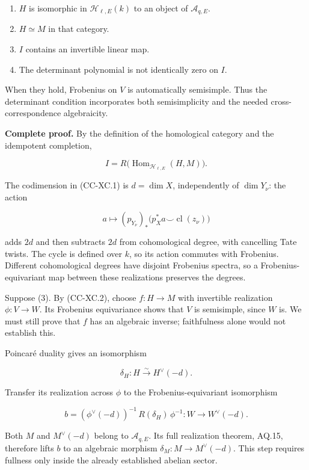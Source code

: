 \documentclass[11pt,a4paper]{article}
\providecommand{\tightlist}{\setlength{\itemsep}{0pt}\setlength{\parskip}{0pt}}
\theoremstyle{definition}\newtheorem{definition}[theorem]{Definition}
\theoremstyle{remark}\newtheorem{remark}[theorem]{Remark}
\begin{document}
\begin{enumerate}
\def\labelenumi{\arabic{enumi}.}
\tightlist
\item
  \(H\) is isomorphic in \(\mathcal H_{\ell,E}(k)\) to an object of
  \(\mathcal A_{q,E}\).
\item
  \(H\simeq M\) in that category.
\item
  \(I\) contains an invertible linear map.
\item
  The determinant polynomial is not identically zero on \(I\).
\end{enumerate}

When they hold, Frobenius on \(V\) is automatically semisimple. Thus the
determinant condition incorporates both semisimplicity and the needed
cross-correspondence algebraicity.

\textbf{Complete proof.} By the definition of the homological category
and the idempotent completion,

\[
 I=R\bigl(\operatorname{Hom}_{\mathcal H_{\ell,E}}(H,M)\bigr).
                                                        \tag{CC-XC.2}
\]

The codimension in (CC-XC.1) is \(d=\dim X\), independently of
\(\dim Y_\nu\): the action

\[
 a\longmapsto(p_{Y_\nu})_*\bigl(p_X^*a\smile\operatorname{cl}(z_\nu)\bigr)
\]

adds \(2d\) and then subtracts \(2d\) from cohomological degree, with
cancelling Tate twists. The cycle is defined over \(k\), so its action
commutes with Frobenius. Different cohomological degrees have disjoint
Frobenius spectra, so a Frobenius-equivariant map between these
realizations preserves the degrees.

Suppose (3). By (CC-XC.2), choose \(f:H\to M\) with invertible
realization \(\phi:V\to W\). Its Frobenius equivariance shows that \(V\)
is semisimple, since \(W\) is. We must still prove that \(f\) has an
algebraic inverse; faithfulness alone would not establish this.

Poincaré duality gives an isomorphism

\[
 \delta_H:H\xrightarrow{\sim}H^\vee(-d).
\]

Transfer its realization across \(\phi\) to the Frobenius-equivariant
isomorphism

\[
 b=(\phi^\vee(-d))^{-1}\,R(\delta_H)\,\phi^{-1}:
       W\longrightarrow W^\vee(-d).               \tag{CC-XC.3}
\]

Both \(M\) and \(M^\vee(-d)\) belong to \(\mathcal A_{q,E}\). Its full
realization theorem, AQ.15, therefore lifts \(b\) to an algebraic
morphism \(\delta_M:M\to M^\vee(-d)\). This step requires fullness only
inside the already established abelian sector.
\end{document}
